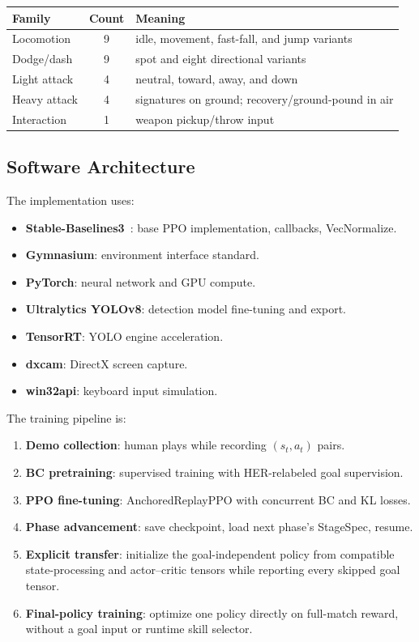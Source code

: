 \documentclass[11pt,a4paper]{article}
\begin{document}
\begin{table}[h]
\centering
\small
\begin{tabular}{@{}lcl@{}}
\toprule
\textbf{Family} & \textbf{Count} & \textbf{Meaning} \\
\midrule
Locomotion & 9 & idle, movement, fast-fall, and jump variants \\
Dodge/dash & 9 & spot and eight directional variants \\
Light attack & 4 & neutral, toward, away, and down \\
Heavy attack & 4 & signatures on ground; recovery/ground-pound in air \\
Interaction & 1 & weapon pickup/throw input \\
\bottomrule
\end{tabular}
\end{table}

\subsection{Software Architecture}

The implementation uses:
\begin{itemize}[leftmargin=1.5em]
    \item \textbf{Stable-Baselines3}~\cite{raffin2021stable}: base PPO implementation, callbacks, VecNormalize.
    \item \textbf{Gymnasium}: environment interface standard.
    \item \textbf{PyTorch}: neural network and GPU compute.
    \item \textbf{Ultralytics YOLOv8}: detection model fine-tuning and export.
    \item \textbf{TensorRT}: YOLO engine acceleration.
    \item \textbf{dxcam}: DirectX screen capture.
    \item \textbf{win32api}: keyboard input simulation.
\end{itemize}

The training pipeline is:
\begin{enumerate}[leftmargin=1.5em]
    \item \textbf{Demo collection}: human plays while recording $(s_t, a_t)$ pairs.
    \item \textbf{BC pretraining}: supervised training with HER-relabeled goal supervision.
    \item \textbf{PPO fine-tuning}: AnchoredReplayPPO with concurrent BC and KL losses.
    \item \textbf{Phase advancement}: save checkpoint, load next phase's StageSpec, resume.
    \item \textbf{Explicit transfer}: initialize the goal-independent policy from compatible
          state-processing and actor--critic tensors while reporting every skipped goal tensor.
    \item \textbf{Final-policy training}: optimize one policy directly on full-match reward,
          without a goal input or runtime skill selector.
\end{enumerate}
\end{document}
